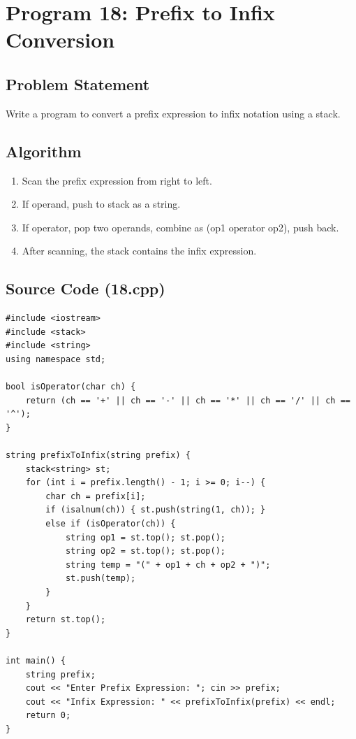 \documentclass[a4paper,12pt]{article}
\begin{document}
\newpage

\section*{Program 18: Prefix to Infix Conversion}

\subsection*{Problem Statement}
Write a program to convert a prefix expression to infix notation using a stack.

\subsection*{Algorithm}
\begin{enumerate}
    \item Scan the prefix expression from right to left.
    \item If operand, push to stack as a string.
    \item If operator, pop two operands, combine as (op1 operator op2), push back.
    \item After scanning, the stack contains the infix expression.
\end{enumerate}

\subsection*{Source Code (18.cpp)}
\begin{lstlisting}[style=cppstyle]
#include <iostream>
#include <stack>
#include <string>
using namespace std;

bool isOperator(char ch) {
    return (ch == '+' || ch == '-' || ch == '*' || ch == '/' || ch == '^');
}

string prefixToInfix(string prefix) {
    stack<string> st;
    for (int i = prefix.length() - 1; i >= 0; i--) {
        char ch = prefix[i];
        if (isalnum(ch)) { st.push(string(1, ch)); }
        else if (isOperator(ch)) {
            string op1 = st.top(); st.pop();
            string op2 = st.top(); st.pop();
            string temp = "(" + op1 + ch + op2 + ")";
            st.push(temp);
        }
    }
    return st.top();
}

int main() {
    string prefix;
    cout << "Enter Prefix Expression: "; cin >> prefix;
    cout << "Infix Expression: " << prefixToInfix(prefix) << endl;
    return 0;
}
\end{lstlisting}
\end{document}
